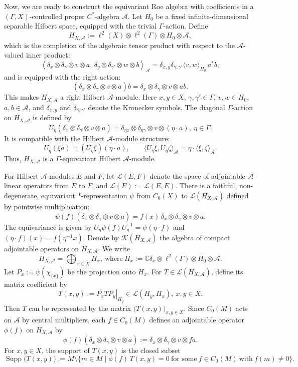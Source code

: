 \documentclass[pdflatex]{sn-jnl}
\theoremstyle{plain}
\theoremstyle{definition}
\begin{document}
Now, we are ready to construct the equivariant Roe algebra with coefficients in a
$(\Gamma,X)$-controlled proper $C^*$-algebra $\mathcal{A}$.
Let $H_0$ be a fixed infinite-dimensional separable Hilbert space,
equipped with the trivial $\Gamma$-action. Define
\[H_{X,\mathcal{A}}:=
\ell^2(X)\otimes\ell^2(\Gamma)\otimes H_0\otimes\mathcal{A},\]which is the completion of the algebraic tensor product with respect to the $\mathcal{A}$-valued inner product:
\[\left\langle
\delta_x\otimes\delta_\gamma\otimes v\otimes a,\,
\delta_y\otimes\delta_{\gamma'}\otimes w\otimes b
\right\rangle_{\mathcal{A}}=
\delta_{x,y}\delta_{\gamma,\gamma'}
\langle v,w\rangle_{H_0}\,a^*b,\]
and is equipped with the right action:
\[(\delta_x\otimes\delta_\gamma\otimes v\otimes a)b=
\delta_x\otimes\delta_\gamma\otimes v\otimes ab.\]
This makes $H_{X,\mathcal{A}}$ a right Hilbert $\mathcal{A}$-module.
Here $x,y\in X$, $\gamma,\gamma'\in\Gamma$, $v,w\in H_0$,
$a,b\in\mathcal{A}$, and $\delta_{x,y}$ and
$\delta_{\gamma,\gamma'}$ denote the Kronecker symbols.
The diagonal $\Gamma$-action on $H_{X,\mathcal{A}}$ is defined by
\[U_\eta(\delta_x\otimes\delta_\gamma\otimes v\otimes a)
=\delta_{\eta x}\otimes\delta_{\eta\gamma}
\otimes v\otimes(\eta\cdot a),
\ \eta\in\Gamma.\]
It is compatible with the Hilbert $\mathcal{A}$-module structure:
\[U_\eta(\xi a)=(U_\eta\xi)(\eta\cdot a),
\qquad\langle U_\eta\xi,U_\eta\zeta\rangle_{\mathcal{A}}
=\eta\cdot\langle\xi,\zeta\rangle_{\mathcal{A}}.\]
Thus, $H_{X,\mathcal{A}}$ is a $\Gamma$-equivariant Hilbert
$\mathcal{A}$-module.

For Hilbert $\mathcal{A}$-modules $E$ and $F$, let
$\mathcal{L}(E,F)$ denote the space of adjointable
$\mathcal{A}$-linear operators from $E$ to $F$, and 
$\mathcal{L}(E):=\mathcal{L}(E,E)$.
There is a faithful, non-degenerate, equivariant $*$-representation $\psi$ from $C_0(X)$ to
$\mathcal{L}(H_{X,\mathcal{A}})$
defined by pointwise multiplication:
\[\psi(f)(\delta_x\otimes\delta_\gamma\otimes v\otimes a)
=f(x)\,\delta_x\otimes\delta_\gamma\otimes v\otimes a.\]
The equivariance is given by
$U_\eta\psi(f)U_\eta^{-1}=\psi(\eta\cdot f)$ and 
$(\eta\cdot f)(x)=f(\eta^{-1}x)$.
Denote by $\mathcal K(H_{X,\mathcal{A}})$ the algebra of compact
adjointable operators on $H_{X,\mathcal{A}}$. 
We write
\[H_{X,\mathcal{A}}=
\bigoplus_{x\in X}H_x,\ \text{where}\
H_x:=\mathbb C\delta_x\otimes\ell^2(\Gamma)
\otimes H_0\otimes\mathcal{A}.\]
Let
$P_x:=\psi(\chi_{\{x\}})$
be the projection onto $H_x$. For
$T\in\mathcal{L}(H_{X,\mathcal{A}})$, define its matrix coefficient by
$$T(x,y):=\left.P_xTP_y\right|_{H_y}
\in\mathcal{L}(H_y,H_x),\ x,y\in X.$$ 
Then $T$ can be represented by the matrix
$\bigl(T(x,y)\bigr)_{x,y\in X}$.
Since $C_0(M)$ acts on $\mathcal{A}$ by central multipliers,
each $f\in C_0(M)$ defines an adjointable operator $\phi(f)$ on
$H_{X,\mathcal{A}}$ by
\[\phi(f)(\delta_x\otimes\delta_\gamma\otimes v\otimes a)
:=\delta_x\otimes\delta_\gamma\otimes v\otimes fa.\]
For $x,y\in X$, the support of $T(x,y)$ is the closed subset
\[\operatorname{Supp}\bigl(T(x,y)\bigr):=M\setminus\bigl\{m\in M\mid
\phi(f)\,T(x,y)=0\ \text{for some}\ f\in C_0(M)\ \text{with}\ f(m)\neq0\bigr\}.\]
\end{document}
